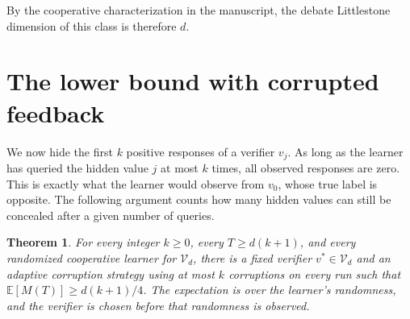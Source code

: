 \documentclass[11pt]{article}
\newcommand{\V}{\mathcal V}
\newcommand{\E}{\mathbb E}
\newtheorem{theorem}{Theorem}
\begin{document}
By the cooperative characterization in the manuscript, the debate
Littlestone dimension of this class is therefore $d$.

\section{The lower bound with corrupted feedback}\label{sec:corrupt}

We now hide the first $k$ positive responses of a verifier $v_j$. As long as
the learner has queried the hidden value $j$ at most $k$ times, all observed
responses are zero. This is exactly what the learner would observe from
$v_0$, whose true label is opposite. The following argument counts how many
hidden values can still be concealed after a given number of queries.

\begin{theorem}\label{thm:corrupt}
For every integer $k\ge0$, every $T\ge d(k+1)$, and every randomized
cooperative learner for $\V_d$, there is a fixed verifier $v^*\in\V_d$ and
an adaptive corruption strategy using at most $k$ corruptions on every run
such that $\E[M(T)]\ge d(k+1)/4$. The expectation is over the learner's
randomness, and the verifier is chosen before that randomness is observed.
\end{theorem}
\end{document}
